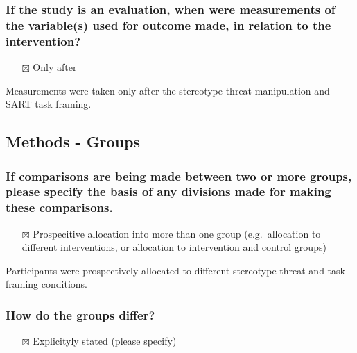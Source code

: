 \documentclass[
  doc, a4paper]{apa7}
\providecommand{\tightlist}{%
  \setlength{\itemsep}{0pt}\setlength{\parskip}{0pt}}
\begin{document}
\subsubsection{If the study is an evaluation, when were measurements of the variable(s) used for outcome made, in relation to the intervention?}\label{if-the-study-is-an-evaluation-when-were-measurements-of-the-variables-used-for-outcome-made-in-relation-to-the-intervention}

\begin{itemize}
\tightlist
\item[$\boxtimes$]
  Only after
\end{itemize}

Measurements were taken only after the stereotype threat manipulation and SART task framing.

\subsection{Methods - Groups}\label{methods---groups}

\subsubsection{If comparisons are being made between two or more groups, please specify the basis of any divisions made for making these comparisons.}\label{if-comparisons-are-being-made-between-two-or-more-groups-please-specify-the-basis-of-any-divisions-made-for-making-these-comparisons.}

\begin{itemize}
\tightlist
\item[$\boxtimes$]
  Prospecitive allocation into more than one group (e.g.~allocation to different interventions, or allocation to intervention and control groups)
\end{itemize}

Participants were prospectively allocated to different stereotype threat and task framing conditions.

\subsubsection{How do the groups differ?}\label{how-do-the-groups-differ}

\begin{itemize}
\tightlist
\item[$\boxtimes$]
  Explicityly stated (please specify)
\end{itemize}
\end{document}
